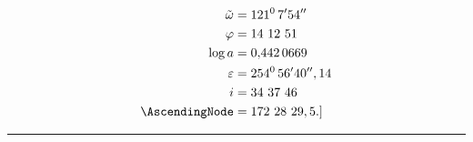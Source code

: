 \begin{landscape}
\[\begin{aligned}
\tilde\omega&=121^{0}\,7'54''\\
\varphi&=14\ 12\ 51\\
\log a&=0{,}442\,0669\\
\varepsilon&=254^{0}\,56'40'',14\\
i&=34\ 37\ 46\\
\AscendingNode&=172\ 28\ 29,5.]
\end{aligned}\]
\par\medskip\begin{center}\rule{.45\linewidth}{.3pt}\end{center}
\par\endgroup
\end{landscape}
